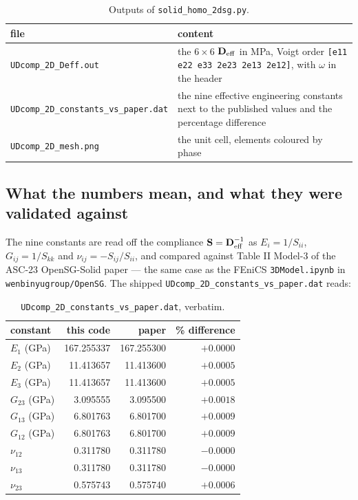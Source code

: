 \begin{table}[htbp]
\centering
\footnotesize
\begin{tabular}{lp{8.2cm}}
\toprule
file & content \\
\midrule
\texttt{UDcomp\_2D\_Deff.out} & the $6\times6$ $\mathbf{D}_{\rm eff}$ in MPa,
  Voigt order \texttt{[e11 e22 e33 2e23 2e13 2e12]}, with $\omega$ in the
  header \\
\texttt{UDcomp\_2D\_constants\_vs\_paper.dat} & the nine effective engineering
  constants next to the published values and the percentage difference \\
\texttt{UDcomp\_2D\_mesh.png} & the unit cell, elements coloured by phase \\
\bottomrule
\end{tabular}
\caption{Outputs of \texttt{solid\_homo\_2dsg.py}.}
\label{tab:solid-ex5out}
\end{table}

\subsection{What the numbers mean, and what they were validated against}

The nine constants are read off the compliance
$\mathbf{S} = \mathbf{D}_{\rm eff}^{-1}$ as $E_i = 1/S_{ii}$,
$G_{ij} = 1/S_{kk}$ and $\nu_{ij} = -S_{ij}/S_{ii}$, and compared against Table
II Model-3 of the ASC-23 OpenSG-Solid paper --- the same case as the FEniCS
\texttt{3DModel.ipynb} in \texttt{wenbinyugroup/OpenSG}. The shipped
\texttt{UDcomp\_2D\_constants\_vs\_paper.dat} reads:

\begin{table}[htbp]
\centering
\small
\begin{tabular}{lrrr}
\toprule
constant & this code & paper & \% difference \\
\midrule
$E_1$ (GPa) & 167.255337 & 167.255300 & $+0.0000$ \\
$E_2$ (GPa) & 11.413657 & 11.413600 & $+0.0005$ \\
$E_3$ (GPa) & 11.413657 & 11.413600 & $+0.0005$ \\
$G_{23}$ (GPa) & 3.095555 & 3.095500 & $+0.0018$ \\
$G_{13}$ (GPa) & 6.801763 & 6.801700 & $+0.0009$ \\
$G_{12}$ (GPa) & 6.801763 & 6.801700 & $+0.0009$ \\
$\nu_{12}$ & 0.311780 & 0.311780 & $-0.0000$ \\
$\nu_{13}$ & 0.311780 & 0.311780 & $-0.0000$ \\
$\nu_{23}$ & 0.575743 & 0.575740 & $+0.0006$ \\
\bottomrule
\end{tabular}
\caption{\texttt{UDcomp\_2D\_constants\_vs\_paper.dat}, verbatim.}
\label{tab:solid-udvspaper}
\end{table}

